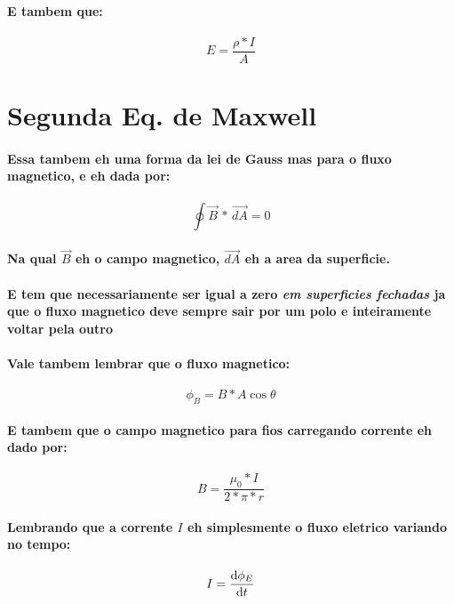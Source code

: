 \documentclass[12pt,twoside, a4paper, twocolumn]{article}
\begin{document}
\paragraph*{E tambem que:}
\begin{equation}
    E = \frac{\rho*I}{A}
\end{equation}

\section{Segunda Eq. de Maxwell}
\paragraph*{Essa tambem eh uma forma da lei de Gauss mas para o fluxo magnetico, e eh dada por:}
\begin{equation}
    \oint  \vec{B} \, * \, \vec{dA} = 0
\end{equation}
\paragraph*{Na qual $\vec{B}$ eh o campo magnetico, $\vec{dA}$ eh a area da superficie.}
\paragraph*{E tem que necessariamente ser igual a zero \emph{em superficies fechadas} ja que o fluxo magnetico deve sempre sair por um polo e inteiramente voltar pela outro}

\paragraph*{Vale tambem lembrar que o fluxo magnetico:}
\begin{equation}
    \phi_B = B  *  A \cos{\theta}
\end{equation}
\paragraph*{E tambem que o campo magnetico para fios carregando corrente eh dado por:}
\begin{equation}
    B = \frac{\mu_0 * I}{2 * \pi * r}
\end{equation}
\paragraph*{Lembrando que a corrente $I$ eh simplesmente o fluxo eletrico variando no tempo:}
\begin{equation}
    I = \frac{\mathrm d \phi_E}{\mathrm d t}
\end{equation}
\end{document}
